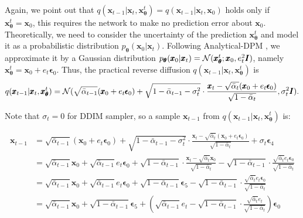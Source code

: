 \documentclass{article} \usepackage{iclr2024_conference,times}
\begin{document}
Again, we point out that $q(\pmb{x}_{t-1} | \pmb{x}_t, \pmb{x}^{t}_{\pmb{\theta}}) = q(\pmb{x}_{t-1} | \pmb{x}_t, \pmb{x}_0)$ holds only if $\pmb{x}^{t}_{\pmb{\theta}} = \pmb{x}_0$, this requires the network to make no prediction error about $\pmb{x}_0$. Theoretically, we need to consider the uncertainty of the prediction $\pmb{x}^{t}_{\pmb{\theta}}$ and model it as a probabilistic distribution $p_{\pmb{\theta}}(\pmb{x}_{0} | \pmb{x}_{t})$. Following Analytical-DPM \citep{bao2022analytic}, we approximate it by a Gaussian distribution $p_{\pmb{\theta}}(\pmb{x}_{0} | \pmb{x}_{t}) = {\cal N} (\pmb{x}^{t}_{\pmb{\theta}}; \pmb{x}_{0}, e_{t}^{2} \pmb{I})$, namely $\pmb{x}^{t}_{\pmb{\theta}} = \pmb{x}_{0} + e_t \pmb{\epsilon}_0$. Thus, the practical reverse diffusion $q(\pmb{x}_{t-1} | \pmb{x}_t, \pmb{x}^{t}_{\pmb{\theta}})$ is
\begin{equation}
\label{eq28}
q(\pmb{x}_{t-1} | \pmb{x}_t, \pmb{x}^{t}_{\pmb{\theta}}) = {\cal N} (\sqrt{\bar{\alpha}_{t-1}} (\pmb{x}_{0} + e_t \pmb{\epsilon}_0) + \sqrt{1-\bar{\alpha}_{t-1}-\sigma_t^2} \cdot \frac{\pmb{x}_t-\sqrt{\bar{\alpha}_t} (\pmb{x}_{0} + e_t \pmb{\epsilon}_0)}{\sqrt{1-\bar{\alpha}_t}}, \sigma_t^2 \pmb{I}).
\end{equation}

\noindent
Note that $\sigma_t=0$ for DDIM sampler, so a sample $\pmb{x}_{t-1}$ from $q(\pmb{x}_{t-1} | \pmb{x}_t, \pmb{x}^{t}_{\pmb{\theta}})$ is:

\begin{align}
\pmb{x}_{t-1} & = \sqrt{\bar{\alpha}_{t-1}} (\pmb{x}_{0} + e_t \pmb{\epsilon}_0) + \sqrt{1-\bar{\alpha}_{t-1}-\sigma_t^2} \cdot \frac{\pmb{x}_t-\sqrt{\bar{\alpha}_t} (\pmb{x}_{0} + e_t \pmb{\epsilon}_0)}{\sqrt{1-\bar{\alpha}_t}} + \sigma_t \pmb{\epsilon}_4 \nonumber \\
& = \sqrt{\bar{\alpha}_{t-1}} \pmb{x}_{0} + \sqrt{\bar{\alpha}_{t-1}} e_t \pmb{\epsilon}_0 + \sqrt{1-\bar{\alpha}_{t-1}} \cdot \frac{\pmb{x}_t-\sqrt{\bar{\alpha}_t} \pmb{x}_0}{\sqrt{1-\bar{\alpha}_t}} - \sqrt{1-\bar{\alpha}_{t-1}} \cdot \frac{\sqrt{\bar{\alpha}_t} e_t \pmb{\epsilon}_0}{\sqrt{1-\bar{\alpha}_t}} 
\label{eq29} \\
& = \sqrt{\bar{\alpha}_{t-1}} \pmb{x}_{0} + \sqrt{\bar{\alpha}_{t-1}} e_t \pmb{\epsilon}_0 + \sqrt{1-\bar{\alpha}_{t-1}} \pmb{\epsilon}_5 - \sqrt{1-\bar{\alpha}_{t-1}} \cdot \frac{\sqrt{\bar{\alpha}_t} e_t \pmb{\epsilon}_0}{\sqrt{1-\bar{\alpha}_t}} \label{eq30} \\
& = \sqrt{\bar{\alpha}_{t-1}} \pmb{x}_{0} + \sqrt{1-\bar{\alpha}_{t-1}} \pmb{\epsilon}_5 + (\sqrt{\bar{\alpha}_{t-1}} e_t - \sqrt{1-\bar{\alpha}_{t-1}} \cdot \frac{\sqrt{\bar{\alpha}_t} e_t}{\sqrt{1-\bar{\alpha}_t}})\pmb{\epsilon}_0 \label{eq31} \\
\nonumber
\end{align}
\end{document}
